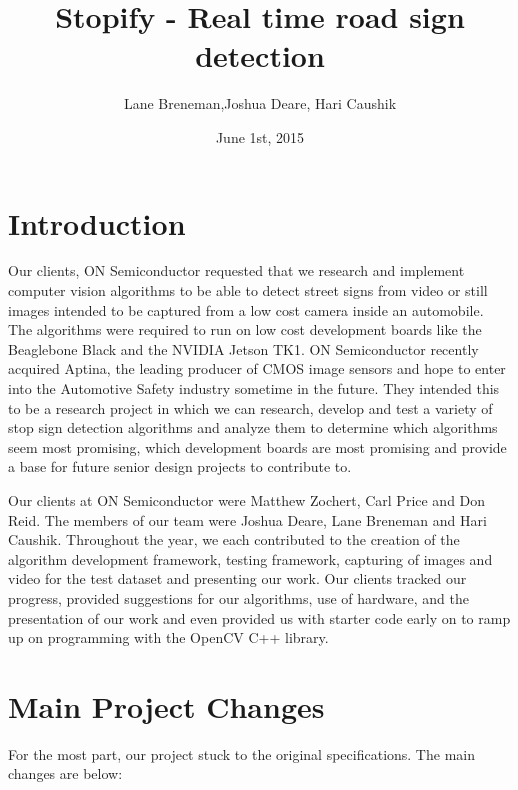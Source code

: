 \documentclass[letterpaper,10pt,titlepage]{article}
\title{Stopify - Real time road sign detection}
\date{June 1st, 2015}
\author{Lane Breneman,Joshua Deare, Hari Caushik}
\begin{document}
\maketitle
\newpage

\section*{Introduction}
Our clients, ON Semiconductor requested that we research and implement computer
vision algorithms to be able to detect street signs from video or still images
intended to be captured from a low cost camera inside an automobile. The 
algorithms were required to run on low cost development boards like the 
Beaglebone Black and the NVIDIA Jetson TK1. ON Semiconductor recently acquired
Aptina, the leading producer of CMOS image sensors and hope to enter into the
Automotive Safety industry sometime in the future. They intended this to be a 
research project in which we can research, develop and test a variety of stop 
sign detection algorithms and analyze them to determine which algorithms seem
most promising, which development boards are most promising and provide a base 
for future senior design projects to contribute to.

Our clients at ON Semiconductor were Matthew Zochert, Carl Price and Don Reid.
The members of our team were Joshua Deare, Lane Breneman and Hari Caushik. 
Throughout the year, we each contributed to the creation of the algorithm 
development framework, testing framework, capturing of images and video for 
the test dataset and presenting our work. Our clients tracked our progress,
provided suggestions for our algorithms, use of hardware, and the presentation
of our work and even provided us with starter code early on to ramp up on 
programming with the OpenCV C++ library. 

\section*{Main Project Changes}
For the most part, our project stuck to the original specifications. The main
changes are below:
\end{document}
